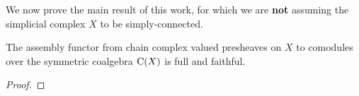 We now prove the main result of this work, for which we are \textbf{not} assuming the simplicial complex $X$ to be simply-connected.

\begin{theorem*}
	The assembly functor from chain complex valued presheaves on $X$ to comodules over the symmetric coalgebra $\operatorname{C}(X)$ is full and faithful.
\end{theorem*}

\begin{proof}
	
\end{proof}